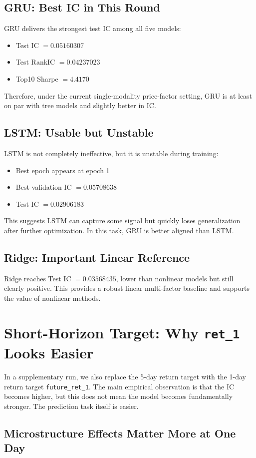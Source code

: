 \subsection{GRU: Best IC in This Round}
GRU delivers the strongest test IC among all five models:
\begin{itemize}
	\item Test IC $=0.05160307$
	\item Test RankIC $=0.04237023$
	\item Top10 Sharpe $=4.4170$
\end{itemize}
Therefore, under the current single-modality price-factor setting, GRU is at least on par with tree models and slightly better in IC.

\subsection{LSTM: Usable but Unstable}
LSTM is not completely ineffective, but it is unstable during training:
\begin{itemize}
	\item Best epoch appears at epoch 1
	\item Best validation IC $=0.05708638$
	\item Test IC $=0.02906183$
\end{itemize}
This suggests LSTM can capture some signal but quickly loses generalization after further optimization. In this task, GRU is better aligned than LSTM.

\subsection{Ridge: Important Linear Reference}
Ridge reaches Test IC $=0.03568435$, lower than nonlinear models but still clearly positive. This provides a robust linear multi-factor baseline and supports the value of nonlinear methods.

\section{Short-Horizon Target: Why \texttt{ret\_1} Looks Easier}

In a supplementary run, we also replace the 5-day return target with the 1-day return target \texttt{future\_ret\_1}. The main empirical observation is that the IC becomes higher, but this does not mean the model becomes fundamentally stronger. The prediction task itself is easier.

\subsection{Microstructure Effects Matter More at One Day}


